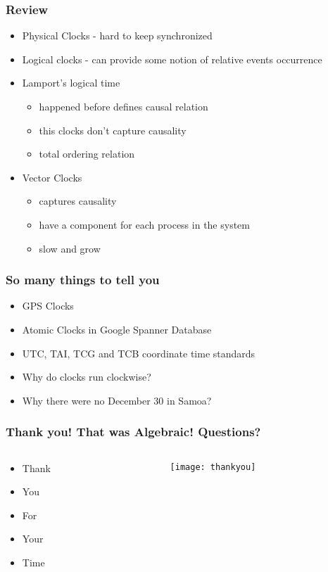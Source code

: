 \documentclass[aspectratio=169, 15pt,usenames,dvipsnames]{beamer}
\begin{document}
	\begin{gdblank}
		\frametitle{Review}
		\begin{itemize}
			\large
			\item Physical Clocks - hard to keep synchronized
			\item Logical clocks - can provide some notion of relative events occurrence
			\item Lamport's logical time
			      \begin{itemize}
			      	\item happened before defines causal relation
			      	\item this clocks don't capture causality
			      	\item total ordering relation
			      \end{itemize}
			\item Vector Clocks
			      \begin{itemize}
			      	\item captures causality
			      	\item have a component for each process in the system
			      	\item slow and grow
			      \end{itemize}
		\end{itemize}
	\end{gdblank} 
	\begin{gdblank}
		\frametitle{So many things to tell you}
		\begin{itemize}
			\item GPS Clocks
			\item Atomic Clocks in Google Spanner Database
			\item UTC, TAI, TCG and TCB coordinate time standards
			\item Why do clocks run clockwise?
			\item Why there were no December 30 in Samoa?
		\end{itemize}
	\end{gdblank} 
	\begin{gdblank}
		\frametitle{Thank you! That was Algebraic! Questions?}
		\begin{columns}
			\begin{column}{0.5\textwidth}
				\begin{itemize}
					\item Thank
					\item You 
					\item For
					\item Your
					\item Time
				\end{itemize}
			\end{column}
			\begin{column}{0.5\textwidth}				
				\texttt{[image: thankyou]}			
			\end{column}	
		\end{columns} 		
	\end{gdblank} 	
\end{document}
